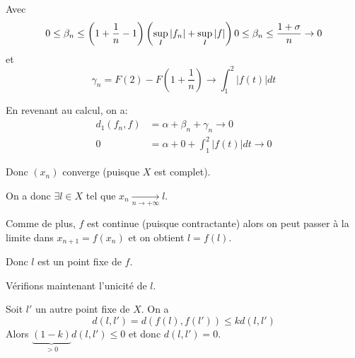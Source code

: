 \documentclass[french,a4paper,10pt]{article}
\begin{document}
    Avec 
    \[
        0\le \beta_n \le \left(1+\frac1n-1\right)\left(\sup_I|f_n|+\sup_I|f|\right)\\
        0\le \beta_n \le \frac{1+\sigma}{n}\to 0
    \]
    et
    \[
        \gamma_n= F(2)-F(1+\frac1n)\to \int_1^2 |f(t)|dt
    \]

    En revenant au calcul, on a:
    \[\begin{aligned}
        d_1(f_n,f)&=\alpha+\beta_n+\gamma_n\to 0\\
        0&=\alpha+0+\int_1^2 |f(t)|dt\to 0
    \end{aligned}\]



    Donc $(x_n)$ converge (puisque $X$ est complet).

    On a donc $\exists l\in X$ tel que $x_n\xrightarrow[n\to+\infty]{}l$.	

    Comme de plus, $f$ est continue (puisque contractante) alors on peut passer à la limite
    dans $x_{n+1}=f(x_n)$ et on obtient $l=f(l)$.

    Donc $l$ est un point fixe de $f$.

    Vérifions maintenant l'unicité de $l$.

    Soit $l'$ un autre point fixe de $X$. On a
    \[
        d(l,l')=d(f(l),f(l'))\leq k d(l,l')
    \]
    Alors $\underbrace{(1-k)}_{>0}d(l,l')\leq 0$ et donc $d(l,l')=0$.
\end{document}
